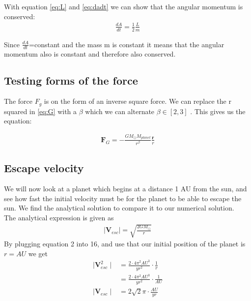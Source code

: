 \documentclass{article}
\begin{document}
With equation \ref{eq:L} and \ref{eq:dadt} we can show that the angular momentum is conserved:
\begin{align}
    \frac{dA}{dt}=\frac{1}{2}\frac{L}{m}
\end{align}

Since $\frac{dA}{dt}$=constant and the mass m is constant it means that the angular momentum also is constant and therefore also conserved.  

\subsection{Testing forms of the force}

The force $F_g$ is on the form of an inverse square force. We can replace the r squared in \ref{eq:G} with a $\beta$ which we can alternate $\beta \in [2,3]$ . This gives us the equation:

\begin{align}
    \mathbf{F}_G=-\frac{GM_{\odot}M_{planet}}{r^{\beta}}\frac{\mathbf{r}}{r}
    \label{eq:F_b}
\end{align}

\subsection{Escape velocity}
We will now look at a planet which begins at a distance 1 AU from the sun, 
and see how fast the initial velocity must be for the planet to be able to escape the sun. We find the analytical solution to compare it to our numerical solution. \\
The analytical expression is given as 
\begin{align}
    \mid{\mathbf{V}_{esc}}\mid=\sqrt{\frac{2GM_{\odot}}{r}}
\end{align}
By plugging equation 2 into 16, and use that our initial position of the planet is $r=AU$ we get
\begin{align}
\mid{\mathbf{V}_{esc}^2}\mid&=\frac{2\cdot 4\pi^2AU^3}{yr^2}\cdot\frac{1}{r}\\
&=\frac{2\cdot 4\pi^2AU^3}{yr^2}\cdot\frac{1}{AU}\\
\mid{\mathbf{V}_{esc}}\mid&=2\sqrt{2}\pi\cdot\frac{AU}{yr}
\end{align}
\end{document}
